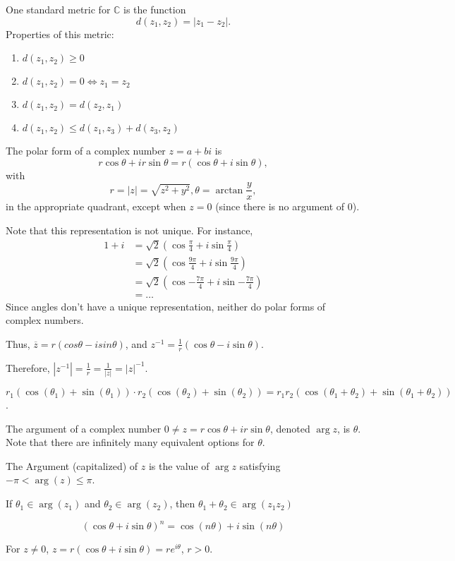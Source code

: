 \documentclass{article}
\newcommand{\inv}{^{-1}}
\newcommand{\C}{\mathbb C}
\begin{document}
\medskip
{}

    One standard metric for $\C$ is the function $$d(z_1, z_2) = |z_1 - z_2|.$$
    Properties of this metric:

    \begin{enumerate}
        \item $d(z_1, z_2) \geq 0$
        \item $d(z_1, z_2) = 0 \iff z_1 = z_2$
        \item $d(z_1, z_2) = d(z_2, z_1)$
        \item $d(z_1, z_2) \leq d(z_1, z_3) + d(z_3, z_2)$
    \end{enumerate}

\medskip
{}

    The polar form of a complex number $z = a+bi$ is $$r\cos\theta + ir\sin\theta = r(\cos\theta + i\sin\theta),$$ with $$r = |z| = \sqrt{z^2+y^2}, \theta = \arctan{\frac yx},$$ in the appropriate quadrant, except when $z=0$ (since there is no argument of $0$).

    Note that this representation is not unique. For instance,
    \begin{align*}
        1 + i &= \sqrt{2}(\cos{\frac{\pi}4} + i\sin{\frac{\pi}4}) \\
              &= \sqrt{2}(\cos{\frac{9\pi}4} + i\sin{\frac{9\pi}4}) \\
              &= \sqrt{2}(\cos{-\frac{7\pi}4} + i\sin{-\frac{7\pi}4}) \\
              &= \hdots
    \end{align*} Since angles don't have a unique representation, neither do polar forms of complex numbers.

    Thus, $\overline z = r(cos\theta - isin\theta)$, and $ z\inv = \frac1r(\cos\theta-i\sin\theta).$

    Therefore, $|z\inv| = \frac1r = \frac1{|z|} = |z|\inv$.

    $r_1(\cos(\theta_1) + \sin(\theta_1)) \cdot r_2(\cos(\theta_2) + \sin(\theta_2)) = r_1r_2(\cos(\theta_1 + \theta_2) + \sin(\theta_1 + \theta_2))$.

\medskip
{}

    The argument of a complex number $0 \neq z = r\cos\theta + ir\sin\theta$, denoted $\arg z$, is $\theta$. Note that there are infinitely many equivalent options for $\theta$.

    The Argument (capitalized) of $z$ is the value of $\arg z$ satisfying $-\pi < \arg(z) \leq \pi$.

    If $\theta_1 \in \arg(z_1)$ and $\theta_2 \in \arg(z_2)$, then $\theta_1 + \theta_2 \in \arg(z_1z_2)$

\medskip
{}

    $$(\cos\theta + i\sin\theta)^n = \cos(n\theta) + i\sin(n\theta)$$

\medskip
{}

    For $z \neq 0$, $z = r(\cos\theta + i\sin\theta) = re^{i\theta}$, $r > 0$.
\end{document}
